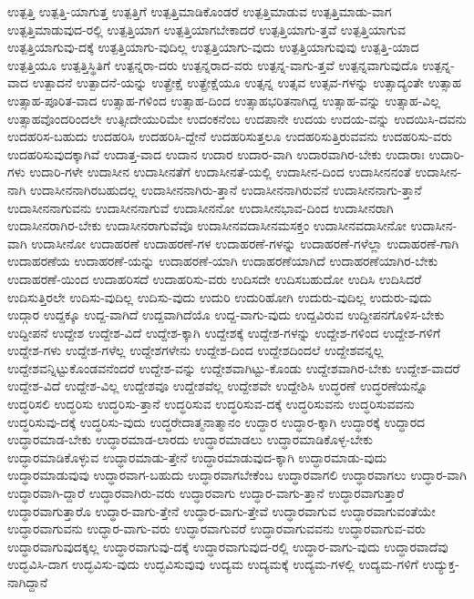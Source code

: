 {ಉತ್ಪತ್ತಿ
ಉತ್ಪತ್ತಿ-ಯಾಗುತ್ತ
ಉತ್ಪತ್ತಿಗೆ
ಉತ್ಪತ್ತಿಮಾಡಿಕೊಂಡರೆ
ಉತ್ಪತ್ತಿಮಾಡುವ
ಉತ್ಪತ್ತಿಮಾಡು-ವಾಗ
ಉತ್ಪತ್ತಿಮಾಡುವುದ-ರಲ್ಲಿ
ಉತ್ಪತ್ತಿಯಾಗ
ಉತ್ಪತ್ತಿಯಾಗಬೇಕಾದರೆ
ಉತ್ಪತ್ತಿಯಾಗು-ತ್ತವೆ
ಉತ್ಪತ್ತಿಯಾಗುವ
ಉತ್ಪತ್ತಿಯಾಗುವು-ದಕ್ಕೆ
ಉತ್ಪತ್ತಿಯಾಗು-ವುದಿಲ್ಲ
ಉತ್ಪತ್ತಿಯಾಗು-ವುದು
ಉತ್ಪತ್ತಿಯಾಗುವುವು
ಉತ್ಪತ್ತಿ-ಯಾದ
ಉತ್ಪತ್ತಿಯೂ
ಉತ್ಪತ್ತಿಸ್ಥಿತಿಗೆ
ಉತ್ಪನ್ನರಾ-ದರು
ಉತ್ಪನ್ನರಾದ-ವರು
ಉತ್ಪನ್ನ-ವಾಗು-ತ್ತವೆ
ಉತ್ಪನ್ನವಾಗುವುದೊ
ಉತ್ಪನ್ನ-ವಾದ
ಉತ್ಪಾದನೆ
ಉತ್ಪಾದನೆ-ಯನ್ನು
ಉತ್ಪ್ರೇಕ್ಷೆ
ಉತ್ಪ್ರೇಕ್ಷೆಯೂ
ಉತ್ಸನ್ನ
ಉತ್ಸವ
ಉತ್ಸವ-ಗಳನ್ನು
ಉತ್ಸಾದ್ಯಂತೇ
ಉತ್ಸಾಹ
ಉತ್ಸಾಹ-ಪೂರಿತ-ವಾದ
ಉತ್ಸಾಹ-ಗಳಿಂದ
ಉತ್ಸಾಹ-ದಿಂದ
ಉತ್ಸಾಹಭರಿತನಾಗಿದ್ದ
ಉತ್ಸಾಹ-ವನ್ನು
ಉತ್ಸಾಹ-ವಿಲ್ಲ
ಉತ್ಸಾಹವೊಂದರಿಂದಲೇ
ಉತ್ಸೀದೇಯುರಿಮೇ
ಉದಂಕನೆಂಬ
ಉದಪಾನೇ
ಉದಯ
ಉದಯ-ವನ್ನು
ಉದಯಿಸಿ-ದವನು
ಉದಹರಿಸ-ಬಹುದು
ಉದಹರಿಸಿ
ಉದಹರಿಸಿ-ದ್ದೇನೆ
ಉದಹರಿಸುತ್ತಲೂ
ಉದಹರಿಸುತ್ತಿರುವವನು
ಉದಹರಿಸು-ವರು
ಉದಹರಿಸುವುದಕ್ಕಾಗಿವೆ
ಉದಾತ್ತ-ವಾದ
ಉದಾನ
ಉದಾರ
ಉದಾರ-ವಾಗಿ
ಉದಾರವಾಗಿರ-ಬೇಕು
ಉದಾರಾಃ
ಉದಾರಿ-ಗಳು
ಉದಾರಿ-ಗಳೇ
ಉದಾಸೀನ
ಉದಾಸೀನತೆಗೆ
ಉದಾಸೀನತೆ-ಯಲ್ಲಿ
ಉದಾಸೀನ-ದಿಂದ
ಉದಾಸೀನನಂತೆ
ಉದಾಸೀನ-ನಾಗಿ
ಉದಾಸೀನನಾಗಿರಬಹುದಲ್ಲ
ಉದಾಸೀನನಾಗಿರು-ತ್ತಾನೆ
ಉದಾಸೀನನಾಗಿರುವನೆ
ಉದಾಸೀನನಾಗು-ತ್ತಾನೆ
ಉದಾಸೀನನಾಗುವನು
ಉದಾಸೀನನಾಗುವೆ
ಉದಾಸೀನನೋ
ಉದಾಸೀನಭಾವ-ದಿಂದ
ಉದಾಸೀನರಾಗಿ
ಉದಾಸೀನರಾಗಿರ-ಬೇಕು
ಉದಾಸೀನರಾಗುವೆವೊ
ಉದಾಸೀನವದಾಸೀನಮಸಕ್ತಂ
ಉದಾಸೀನವದಾಸೀನೋ
ಉದಾಸೀನ-ವಾಗಿ
ಉದಾಸೀನೋ
ಉದಾಹರಣೆ
ಉದಾಹರಣೆ-ಗಳ
ಉದಾಹರಣೆ-ಗಳನ್ನು
ಉದಾಹರಣೆ-ಗಳೆಲ್ಲಾ
ಉದಾಹರಣೆ-ಗಾಗಿ
ಉದಾಹರಣೆಯ
ಉದಾಹರಣೆ-ಯನ್ನು
ಉದಾಹರಣೆ-ಯಾಗಿ
ಉದಾಹರಣೆಯಾಗಿದೆ
ಉದಾಹರಣೆಯಾಗಿರ-ಬೇಕು
ಉದಾಹರಣೆ-ಯಿಂದ
ಉದಾಹರಿಸದೆ
ಉದಾಹರಿಸು-ವರು
ಉದಿಸದೇ
ಉದಿಸಬಹುದೋ
ಉದಿಸಿ
ಉದಿಸಿದರೆ
ಉದಿಸುತ್ತಿರಲೇ
ಉದಿಸು-ವುದಿಲ್ಲ
ಉದಿಸು-ವುದು
ಉದುರಿ
ಉದುರಿಹೋಗಿ
ಉದುರು-ವುದಿಲ್ಲ
ಉದುರು-ವುದು
ಉದ್ಗಾರ
ಉದ್ದಕ್ಕೂ
ಉದ್ದ-ವಾಗಿದೆ
ಉದ್ದವಾಗಿದೆಯೊ
ಉದ್ದ-ವಾಗು-ವುದು
ಉದ್ದವಿರುವ
ಉದ್ದೀಪನಗೊಳಿಸ-ಬೇಕು
ಉದ್ದೀಪನೆ
ಉದ್ದೇಶ
ಉದ್ದೇಶ-ವಿದೆ
ಉದ್ದೇಶ-ಕ್ಕಾಗಿ
ಉದ್ದೇಶಕ್ಕೆ
ಉದ್ದೇಶ-ಗಳನ್ನು
ಉದ್ದೇಶ-ಗಳಿಂದ
ಉದ್ದೇಶ-ಗಳಿಗೆ
ಉದ್ದೇಶ-ಗಳು
ಉದ್ದೇಶ-ಗಳೆಲ್ಲ
ಉದ್ದೇಶಗಳೇನು
ಉದ್ದೇಶ-ದಿಂದ
ಉದ್ದೇಶದಿಂದಲೆ
ಉದ್ದೇಶವನ್ನಲ್ಲ
ಉದ್ದೇಶವನ್ನಿಟ್ಟುಕೊಂಡವನೆಂದರೆ
ಉದ್ದೇಶ-ವನ್ನು
ಉದ್ದೇಶವಾಗಿಟ್ಟು-ಕೊಂಡು
ಉದ್ದೇಶವಾಗಿರ-ಬೇಕು
ಉದ್ದೇಶ-ವಾದರೆ
ಉದ್ದೇಶ-ವಿದೆ
ಉದ್ದೇಶ-ವಿಲ್ಲ
ಉದ್ದೇಶವೂ
ಉದ್ದೇಶವೆಲ್ಲ
ಉದ್ದೇಶವೇ
ಉದ್ದೇಶಿಸಿ
ಉದ್ಧರಣೆ
ಉದ್ಧರಣೆಯನ್ನೊ
ಉದ್ಧರಿಸಲಿ
ಉದ್ಧರಿಸು
ಉದ್ಧರಿಸು-ತ್ತಾನೆ
ಉದ್ಧರಿಸುವ
ಉದ್ಧರಿಸುವ-ದಕ್ಕೆ
ಉದ್ಧರಿಸುವನು
ಉದ್ಧರಿಸುವವನು
ಉದ್ಧರಿಸುವು-ದಕ್ಕೆ
ಉದ್ಧರಿಸು-ವುದು
ಉದ್ಧರೇದಾತ್ಮನಾತ್ಮಾನಂ
ಉದ್ಧಾರ
ಉದ್ಧಾರ-ಕ್ಕಾಗಿ
ಉದ್ಧಾರಕ್ಕೆ
ಉದ್ಧಾರದ
ಉದ್ಧಾರಮಾಡ-ಬೇಕು
ಉದ್ಧಾರಮಾಡ-ಲಾರದು
ಉದ್ಧಾರಮಾಡಲು
ಉದ್ಧಾರಮಾಡಿಕೊಳ್ಳ-ಬೇಕು
ಉದ್ಧಾರಮಾಡಿಕೊಳ್ಳುವ
ಉದ್ಧಾರಮಾಡು-ತ್ತೇನೆ
ಉದ್ಧಾರಮಾಡುವುದ-ಕ್ಕಾಗಿ
ಉದ್ಧಾರಮಾಡು-ವುದು
ಉದ್ಧಾರಮಾಡುವುವು
ಉದ್ಧಾರವಾಗ-ಬಹುದು
ಉದ್ಧಾರವಾಗಬೇಕೆಂಬ
ಉದ್ಧಾರವಾಗಲಿ
ಉದ್ಧಾರವಾಗಲು
ಉದ್ಧಾರ-ವಾಗಿ
ಉದ್ಧಾರವಾಗಿ-ದ್ದಾರೆ
ಉದ್ಧಾರವಾಗಿರು-ವರು
ಉದ್ಧಾರವಾಗು
ಉದ್ಧಾರ-ವಾಗು-ತ್ತಾನೆ
ಉದ್ಧಾರವಾಗುತ್ತಾರೆ
ಉದ್ಧಾರವಾಗುತ್ತಾರೊ
ಉದ್ಧಾರ-ವಾಗು-ತ್ತೇನೆ
ಉದ್ಧಾರ-ವಾಗು-ತ್ತೇವೆ
ಉದ್ಧಾರವಾಗುವ
ಉದ್ಧಾರವಾಗುವಂತೆಯೇ
ಉದ್ಧಾರವಾಗುವನು
ಉದ್ಧಾರ-ವಾಗು-ವರು
ಉದ್ಧಾರವಾಗುವರೆ
ಉದ್ಧಾರವಾಗುವವನು
ಉದ್ಧಾರವಾಗುವ-ವರು
ಉದ್ಧಾರವಾಗುವುದಕ್ಕಲ್ಲ
ಉದ್ಧಾರವಾಗುವು-ದಕ್ಕೆ
ಉದ್ಧಾರವಾಗುವುದ-ರಲ್ಲಿ
ಉದ್ಧಾರ-ವಾಗು-ವುದು
ಉದ್ಧಾರವಾದೆವು
ಉದ್ಭವಿಸಿ-ದಾಗ
ಉದ್ಭವಿಸು-ವುದು
ಉದ್ಭವಿಸುವುವು
ಉದ್ಯಮ
ಉದ್ಯಮಕ್ಕೆ
ಉದ್ಯಮ-ಗಳಲ್ಲಿ
ಉದ್ಯಮ-ಗಳಿಗೆ
ಉದ್ಯುಕ್ತ-ನಾಗಿದ್ದಾನೆ
}
